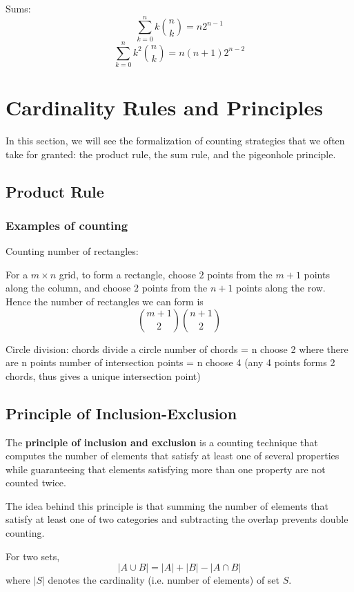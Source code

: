 Sums:
\begin{equation}
\sum_{k=0}^{n} k \binom{n}{k} = n 2^{n-1}
\end{equation}
\begin{equation}
\sum_{k=0}^{n} k^2 \binom{n}{k} = n(n+1) 2^{n-2}
\end{equation}
\pagebreak

\section{Cardinality Rules and Principles}
In this section, we will see the formalization of counting strategies that we often take for granted: the product rule, the sum rule, and the pigeonhole principle.

\subsection{Product Rule}

\subsubsection{Examples of counting}
Counting number of rectangles:

For a $m \times n$ grid, to form a rectangle, choose $2$ points from the $m+1$ points along the column, and choose $2$ points from the $n+1$ points along the row. Hence the number of rectangles we can form is \[ {m+1 \choose 2}{n+1 \choose 2} \]

Circle division: chords divide a circle
number of chords = n choose 2 where there are n points
number of intersection points = n choose 4 (any 4 points forms 2 chords, thus gives a unique intersection point)

\subsection{Principle of Inclusion-Exclusion}
The \textbf{principle of inclusion and exclusion} is a counting technique that computes the number of elements that satisfy at least one of several properties while guaranteeing that elements satisfying more than one property are not counted twice.

The idea behind this principle is that summing the number of elements that satisfy at least one of two categories and subtracting the overlap prevents double counting.

For two sets, 
\[ |A \cup B| = |A| + |B| - |A \cap B| \] 
where $|S|$ denotes the cardinality (i.e. number of elements) of set $S$.

